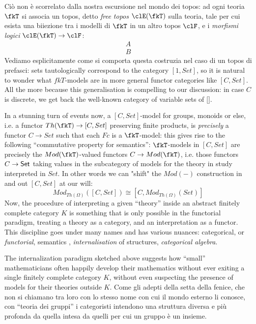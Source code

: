Ciò non è scorrelato dalla nostra escursione nel mondo dei topos: ad ogni teoria $\fkT$ si associa un topos, detto \emph{free topos} $\clE(\fkT)$ sulla teoria, tale per cui esista una biiezione tra i modelli di $\fkT$ in un altro topos $\clF$, e i \emph{morfismi logici} $\clE(\fkT) \to \clF$:
\[\begin{array}{c}
		A \\ \hline  B
	\end{array}\]
Vediamo esplicitamente come si comporta questa costruzia nel caso di un topos di prefasci: sets tautologically correspond to the category $[1,Set]$, so it is natural to wonder what $fkT$-models are in more general functor categories like $[C,Set]$. All the more because this generalisation is compelling to our discussion: in case $C$ is discrete, we get back the well-known category of variable sets of \ref{}.

In a stunning turn of events now, a $[C,Set]$-model for groups, monoids or else, i.e. a functor $Th(\fkT)\to [C,Set]$ preserving finite products, is \emph{precisely} a functor $C\to Set$ such that each $Fc$ is a $\fkT$-model: this gives rise to the following ``commutative property for semantics'': $\fkT$-models in $[C,Set]$ are precisely the $Mod(\fkT)$-valued functors $C\to Mod(\fkT)$, i.e. those functors $C \to \mathsf{Set}$ taking values in the subcategory of models for the theory in study interpreted in $Set$. In other words we can "shift" the $Mod(-)$ construction in and out $[C,Set]$ at our will:
\[
	Mod_{Th(\Omega)}([C,Set]) \cong [C, Mod_{Th(\Omega)}(Set)]
\]
Now, the procedure of interpreting a given ``theory'' inside an abstract finitely complete category $K$ is something that is only possible in the functorial paradigm, treating a theory as a category, and an interpretation as a functor. This discipline goes under many names and has various nuances: categorical, or \emph{functorial}, semantics \cite{lawvere1963functorial}, \emph{internalisation} of structures, \emph{categorical algebra}.

The internalization paradigm sketched above suggests how ``small'' mathematicians often happily develop their mathematics without ever exiting a single finitely complete category $K$, without even suspecting the presence of models for their theories outside $K$. Come gli adepti della setta della fenice, che non si chiamano tra loro con lo stesso nome con cui il mondo esterno li conosce, con ``teoria dei gruppi'' i categoristi intendono una struttura diversa e più profonda da quella intesa da quelli per cui un gruppo è un insieme.

